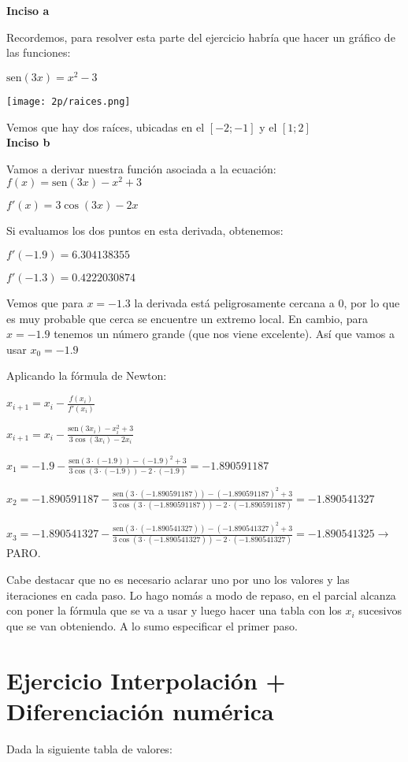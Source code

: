 \documentclass[11pt]{article}
\def\sen{\mathrm{sen}}
\begin{document}
	\textbf{Inciso a}
	
	Recordemos, para resolver esta parte del ejercicio habría que hacer un gráfico de las funciones:
	
	$\sen(3x)=x^2-3$
	
	\texttt{[image: 2p/raices.png]}
	
	Vemos que hay dos raíces, ubicadas en el $[-2;-1]$ y el $[1;2]$\\
	
	\textbf{Inciso b}
	
	Vamos a derivar nuestra función asociada a la ecuación: $f(x)=\sen(3x)-x^2+3$
	
	$f'(x)=3\cos(3x)-2x$
	
	Si evaluamos los dos puntos en esta derivada, obtenemos:
	
	$f'(-1.9)=6.304138355$
	
	$f'(-1.3)=0.4222030874$
	
	Vemos que para $x=-1.3$ la derivada está peligrosamente cercana a 0, por lo que es muy probable que cerca se encuentre un extremo local. En cambio, para $x=-1.9$ tenemos un número grande (que nos viene excelente). Así que vamos a usar $x_0=-1.9$
	
	Aplicando la fórmula de Newton:
	
	$\displaystyle x_{i+1}=x_i-\frac{f(x_i)}{f'(x_i)}$
	
	$\displaystyle x_{i+1}=x_i-\frac{\sen(3x_i)-x_i^2+3}{3\cos(3x_i)-2x_i}$
	
	$\displaystyle x_1=-1.9-\frac{\sen(3\cdot(-1.9))-(-1.9)^2+3}{3\cos(3\cdot(-1.9))-2\cdot(-1.9)}=-1.890591187$
	
	$\displaystyle x_2=-1.890591187-\frac{\sen(3\cdot(-1.890591187))-(-1.890591187)^2+3}{3\cos(3\cdot(-1.890591187))-2\cdot(-1.890591187)}=-1.890541327$
	
	$\displaystyle x_3=-1.890541327-\frac{\sen(3\cdot(-1.890541327))-(-1.890541327)^2+3}{3\cos(3\cdot(-1.890541327))-2\cdot(-1.890541327)}=-1.890541325 \rightarrow $ PARO.
	
	Cabe destacar que no es necesario aclarar uno por uno los valores y las iteraciones en cada paso. Lo hago nomás a modo de repaso, en el parcial alcanza con poner la fórmula que se va a usar y luego hacer una tabla con los $x_i$ sucesivos que se van obteniendo. A lo sumo especificar el primer paso.

	\section{Ejercicio Interpolación + Diferenciación numérica}
	Dada la siguiente tabla de valores:
	
\end{document}
